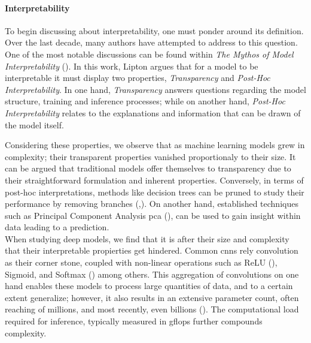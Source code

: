 \paragraph{Interpretability}
To begin discussing about interpretability, one must ponder around its definition. 
Over the last decade, many authors have attempted to address to this question. One 
of the most notable discussions can be found within \emph{The Mythos of Model Interpretability} 
(\cite{mythos_interp}). In this work, Lipton argues that for a model to be interpretable it must 
display two properties, \emph{Transparency} and \emph{Post-Hoc Interpretability}. In one hand, 
\textit{Transparency} answers questions regarding the model structure, training and inference 
processes; while on another hand, \textit{Post-Hoc Interpretability} relates to the explanations 
and information that can be drawn of the model itself.

\noindent Considering these properties, we observe that as machine learning models grew in 
complexity; their transparent properties vanished proportionaly to their size. It can be argued 
that traditional models offer themselves to  transparency due to their straightforward formulation 
and inherent properties. Conversely, in terms of post-hoc interpretations, methods like decision 
trees \cite{ho1995random} can be pruned to study their performance by removing 
branches (\cite{lakkaraju2016interpretable},\cite{mothilal2020explaining}). 
On another hand, established techniques such as Principal Component Analysis \gls{pca} 
(\cite{wold1987principal}), can be used to gain insight within data leading to a prediction.\\

\noindent When studying deep models, we find that it is after their size and complexity that their 
interpretable propierties get hindered. Common  \glspl{cnn} 
rely convolution as their corner stone, coupled with non-linear operations such as 
ReLU (\cite{fukushima1975cognitron}), Sigmoid, and Softmax (\cite{hopfield1985neural}) among others.
This aggregation of convolutions on one hand enables these models to process large quantities of 
data, and to a certain extent generalize; however, it also results in an extensive parameter count,
often reaching of millions, and most recently, even billions (\cite{openai_compute}). The 
computational load required for inference, typically measured in \gls{gflops} further compounds 
complexity.\\

